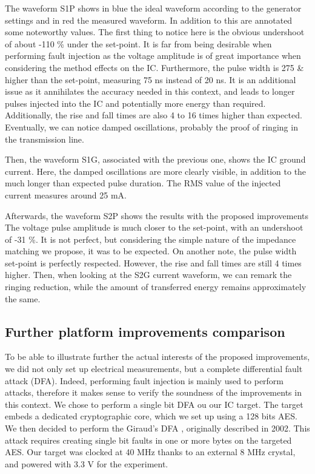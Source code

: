 		The waveform S1P shows in blue the ideal waveform according to the generator settings and in red the measured waveform.
		In addition to this are annotated some noteworthy values.
		The first thing to notice here is the obvious undershoot of about -110 \% under the set-point.
		It is far from being desirable when performing fault injection as the voltage amplitude is of great importance when considering the method effects on the IC.
		Furthermore, the pulse width is 275 \& higher than the set-point, measuring 75 ns instead of 20 ns.
		It is an additional issue as it annihilates the accuracy needed in this context, and leads to longer pulses injected into the IC and potentially more energy than required.
		Additionally, the rise and fall times are also 4 to 16 times higher than expected.
		Eventually, we can notice damped oscillations, probably the proof of ringing in the transmission line.

		Then, the waveform S1G, associated with the previous one, shows the IC ground current.
		Here, the damped oscillations are more clearly visible, in addition to the much longer than expected pulse duration.
		The RMS value of the injected current measures around 25 mA.

		Afterwards, the waveform S2P shows the results with the proposed improvements
		The voltage pulse amplitude is much closer to the set-point, with an undershoot of -31 \%.
		It is not perfect, but considering the simple nature of the impedance matching we propose, it was to be expected.
		On another note, the pulse width set-point is perfectly respected.
		However, the rise and fall times are still 4 times higher.
		Then, when looking at the S2G current waveform, we can remark the ringing reduction, while the amount of transferred energy remains approximately the same.

	\subsection{Further platform improvements comparison}
		To be able to illustrate further the actual interests of the proposed improvements, we did not only set up electrical measurements, but a complete differential fault attack (DFA).
		Indeed, performing fault injection is mainly used to perform attacks, therefore it makes sense to verify the soundness of the improvements in this context.
		We chose to perform a single bit DFA ou our IC target.
		The target embeds a dedicated cryptographic core, which we set up using a 128 bits AES.
		We then decided to perform the Giraud's DFA \cite{giraudDfa}, originally described in 2002.
		This attack requires creating single bit faults in one or more bytes on the targeted AES.
		Our target was clocked at 40 MHz thanks to an external 8 MHz crystal, and powered with 3.3 V for the experiment.

